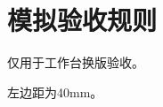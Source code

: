 \documentclass[fontset=fandol,a4paper]{ctexart}
\begin{document}
\section*{模拟验收规则}
仅用于工作台换版验收。
\par 左边距为40mm。
\end{document}
